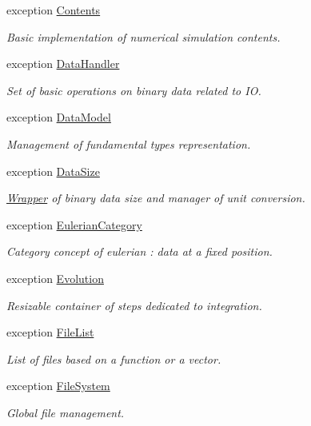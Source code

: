 \begin{DoxyCompactItemize}
exception \hyperlink{exceptionmagrathea_1_1Contents}{Contents}
\begin{DoxyCompactList}\small\item\em Basic implementation of numerical simulation contents. \end{DoxyCompactList}\item 
exception \hyperlink{exceptionmagrathea_1_1DataHandler}{Data\-Handler}
\begin{DoxyCompactList}\small\item\em Set of basic operations on binary data related to I\-O. \end{DoxyCompactList}\item 
exception \hyperlink{exceptionmagrathea_1_1DataModel}{Data\-Model}
\begin{DoxyCompactList}\small\item\em Management of fundamental types representation. \end{DoxyCompactList}\item 
exception \hyperlink{exceptionmagrathea_1_1DataSize}{Data\-Size}
\begin{DoxyCompactList}\small\item\em \hyperlink{exceptionmagrathea_1_1Wrapper}{Wrapper} of binary data size and manager of unit conversion. \end{DoxyCompactList}\item 
exception \hyperlink{exceptionmagrathea_1_1EulerianCategory}{Eulerian\-Category}
\begin{DoxyCompactList}\small\item\em Category concept of eulerian \-: data at a fixed position. \end{DoxyCompactList}\item 
exception \hyperlink{exceptionmagrathea_1_1Evolution}{Evolution}
\begin{DoxyCompactList}\small\item\em Resizable container of steps dedicated to integration. \end{DoxyCompactList}\item 
exception \hyperlink{exceptionmagrathea_1_1FileList}{File\-List}
\begin{DoxyCompactList}\small\item\em List of files based on a function or a vector. \end{DoxyCompactList}\item 
exception \hyperlink{exceptionmagrathea_1_1FileSystem}{File\-System}
\begin{DoxyCompactList}\small\item\em Global file management. \end{DoxyCompactList}\item 

\end{DoxyCompactItemize}
